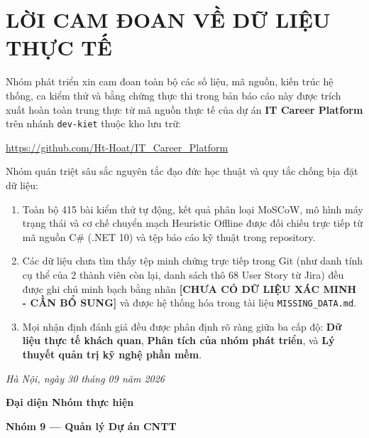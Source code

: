\documentclass[12pt,a4paper,oneside]{report}
\begin{document}
\setcounter{page}{1}

\chapter*{LỜI CAM ĐOAN VỀ DỮ LIỆU THỰC TẾ}

Nhóm phát triển xin cam đoan toàn bộ các số liệu, mã nguồn, kiến trúc hệ thống, ca kiểm thử và bằng chứng thực thi trong bản báo cáo này được trích xuất hoàn toàn trung thực từ mã nguồn thực tế của dự án \textbf{IT Career Platform} trên nhánh \texttt{dev-kiet} thuộc kho lưu trữ:
\begin{center}
\url{https://github.com/Ht-Hoat/IT_Career_Platform}
\end{center}

Nhóm quán triệt sâu sắc nguyên tắc đạo đức học thuật và quy tắc chống bịa đặt dữ liệu:
\begin{enumerate}
    \item Toàn bộ 415 bài kiểm thử tự động, kết quả phân loại MoSCoW, mô hình máy trạng thái và cơ chế chuyển mạch Heuristic Offline được đối chiếu trực tiếp từ mã nguồn C\# (.NET 10) và tệp báo cáo kỹ thuật trong repository.
    \item Các dữ liệu chưa tìm thấy tệp minh chứng trực tiếp trong Git (như danh tính cụ thể của 2 thành viên còn lại, danh sách thô 68 User Story từ Jira) đều được ghi chú minh bạch bằng nhãn \textbf{[CHƯA CÓ DỮ LIỆU XÁC MINH - CẦN BỔ SUNG]} và được hệ thống hóa trong tài liệu \texttt{MISSING\_DATA.md}.
    \item Mọi nhận định đánh giá đều được phân định rõ ràng giữa ba cấp độ: \textbf{Dữ liệu thực tế khách quan}, \textbf{Phân tích của nhóm phát triển}, và \textbf{Lý thuyết quản trị kỹ nghệ phần mềm}.
\end{enumerate}

\begin{flushright}
\textit{Hà Nội, ngày 30 tháng 09 năm 2026}\par
\textbf{Đại diện Nhóm thực hiện}\par
\vspace{1.5cm}
\textbf{Nhóm 9 --- Quản lý Dự án CNTT}
\end{flushright}

\clearpage
\end{document}
